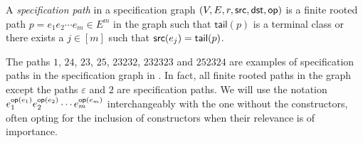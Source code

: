 \begin{definition}
A \emph{specification path} in a specification graph $(V,E,r,\textsf{src},\textsf{dst},\textsf{op})$ is a finite rooted path $p=e_1e_2\dotsm e_m \in E^m$ in the graph such that $\textsf{tail}(p)$ is a terminal class or there exists a $j\in[m]$ such that $\textsf{src}(e_j) = \textsf{tail}(p)$.
\end{definition}
The paths $1$, $24$, $23$, $25$, $23232$, $232323$ and $252324$ are examples of specification paths in the specification graph in . In fact, all finite rooted paths in the graph except the paths $\varepsilon$ and $2$ are specification paths. We will use the notation $e_1^{\textsf{op}(e_1)}e_2^{\textsf{op}(e_2)}\dotsm e_m^{\textsf{op}(e_m)}$ interchangeably with the one without the constructors, often opting for the inclusion of constructors when their relevance is of importance. 

